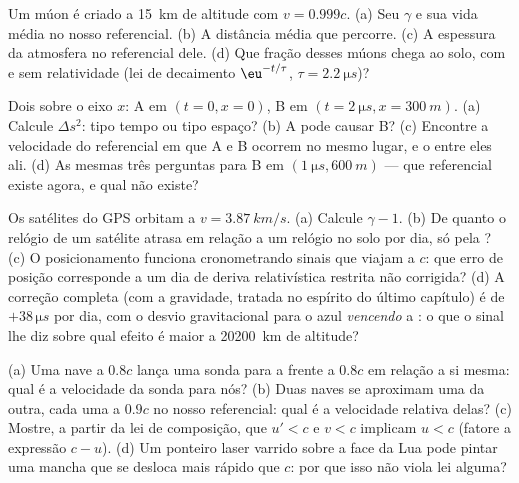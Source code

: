 \begin{exercise}[$\star$]\label{exo:b3:relativistic-kinematics:3}
Um múon é criado a \qty{15}{km} de altitude com $v = 0.999c$. (a) Seu
$\gamma$ e sua vida média no nosso referencial. (b) A distância média
que percorre. (c) A espessura da atmosfera no referencial dele. (d) Que
fração desses múons chega ao solo, com e sem relatividade (lei de
decaimento $\eu^{-t/\tau}$, $\tau = \qty{2.2}{\micro s}$)?
\end{exercise}

\begin{exercise}[$\star$]\label{exo:b3:relativistic-kinematics:4}
Dois  sobre o eixo $x$: A em $(t = 0, x = 0)$, B em $(t =
\qty{2}{\micro s}, x = \qty{300}{m})$. (a) Calcule $\Delta s^2$: tipo
tempo ou tipo espaço? (b) A pode causar B? (c) Encontre a velocidade do
referencial em que A e B ocorrem no mesmo lugar, e o 
entre eles ali. (d) As mesmas três perguntas para B em
$(\qty{1}{\micro s}, \qty{600}{m})$ --- que referencial existe agora, e
qual não existe?
\end{exercise}

\begin{exercise}[$\star\star$]\label{exo:b3:relativistic-kinematics:5}
Os satélites do GPS orbitam a $v = \qty{3.87}{km/s}$. (a) Calcule $\gamma -
1$. (b) De quanto o relógio de um satélite atrasa em relação a um
relógio no solo por dia, só pela ? (c) O
posicionamento funciona cronometrando sinais que viajam a $c$: que erro
de posição corresponde a um dia de deriva relativística restrita não
corrigida? (d) A correção completa (com a gravidade, tratada no
espírito do último capítulo) é de $+38\,\unit{\micro s}$ por dia, com o
desvio gravitacional para o azul \emph{vencendo} a :
o que o sinal lhe diz sobre qual efeito é maior a \qty{20200}{km} de
altitude?
\end{exercise}

\begin{exercise}[$\star\star$]\label{exo:b3:relativistic-kinematics:6}
(a) Uma nave a $0.8c$ lança uma sonda para a frente a $0.8c$ em relação
a si mesma: qual é a velocidade da sonda para nós? (b) Duas naves se
aproximam uma da outra, cada uma a $0.9c$ no nosso referencial: qual é
a velocidade relativa delas? (c) Mostre, a partir da lei de composição,
que $u' < c$ e $v < c$ implicam $u < c$ (fatore a expressão $c - u$).
(d) Um ponteiro laser varrido sobre a face da Lua pode pintar uma
mancha que se desloca mais rápido que $c$: por que isso não viola lei
alguma?
\end{exercise}

